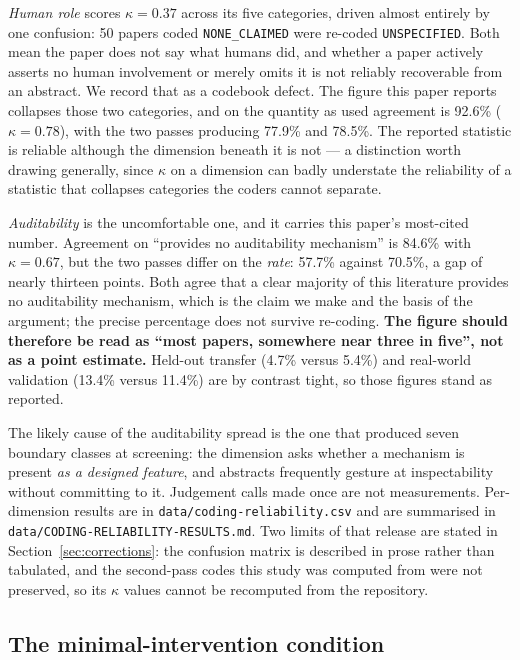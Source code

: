 \emph{Human role} scores $\kappa=0.37$ across its five categories, driven almost entirely by
one confusion: 50 papers coded \texttt{NONE\_CLAIMED} were re-coded \texttt{UNSPECIFIED}. Both
mean the paper does not say what humans did, and whether a paper actively asserts no human
involvement or merely omits it is not reliably recoverable from an abstract. We record that as
a codebook defect. The figure this paper reports collapses those two categories, and on the
quantity as used agreement is 92.6\% ($\kappa=0.78$), with the two passes producing 77.9\% and
78.5\%. The reported statistic is reliable although the dimension beneath it is not --- a
distinction worth drawing generally, since $\kappa$ on a dimension can badly understate the
reliability of a statistic that collapses categories the coders cannot separate.

\emph{Auditability} is the uncomfortable one, and it carries this paper's most-cited number.
Agreement on ``provides no auditability mechanism'' is 84.6\% with $\kappa=0.67$, but the two
passes differ on the \emph{rate}: 57.7\% against 70.5\%, a gap of nearly thirteen points. Both
agree that a clear majority of this literature provides no auditability mechanism, which is
the claim we make and the basis of the argument; the precise percentage does not survive
re-coding. \textbf{The \pctAuditNone{} figure should therefore be read as ``most papers,
somewhere near three in five'', not as a point estimate.} Held-out transfer (4.7\% versus
5.4\%) and real-world validation (13.4\% versus 11.4\%) are by contrast tight, so those
figures stand as reported.

The likely cause of the auditability spread is the one that produced seven boundary classes at
screening: the dimension asks whether a mechanism is present \emph{as a designed feature}, and
abstracts frequently gesture at inspectability without committing to it. Judgement calls made
once are not measurements. Per-dimension results are in
\texttt{data/coding-reliability.csv} and are summarised in
\texttt{data/CODING-RELIABILITY-RESULTS.md}. Two limits of that release are stated in
Section~\ref{sec:corrections}: the confusion matrix is described in prose rather than tabulated, and
the second-pass codes this study was computed from were not preserved, so its $\kappa$ values
cannot be recomputed from the repository.

\subsection{The minimal-intervention condition}
\label{sec:minimal}

